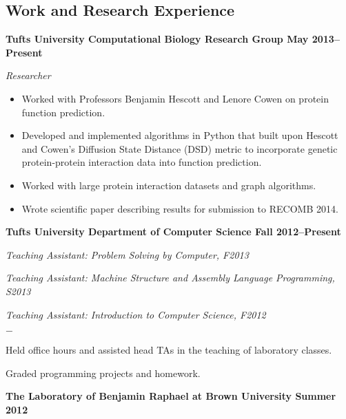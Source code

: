\documentclass[margin,line]{res}
\newenvironment{list1}{
  \begin{list}{\ding{113}}{%
      \setlength{\itemsep}{0in}
      \setlength{\parsep}{0in} \setlength{\parskip}{0in}
      \setlength{\topsep}{0in} \setlength{\partopsep}{0in} 
      \setlength{\leftmargin}{0.17in}}}{\end{list}}
\newenvironment{list2}{
  \begin{list}{$-$}{%
      \setlength{\itemsep}{0in}
      \setlength{\parsep}{0in} \setlength{\parskip}{0in}
      \setlength{\topsep}{0in} \setlength{\partopsep}{0in} 
      \setlength{\leftmargin}{0.2in}}}{\end{list}}
\begin{document}
\begin{resume}
\section{\sc Work and Research Experience}
{\bf Tufts University Computational Biology Research Group \hfill May 2013--Present}\\
\vspace*{-.15in}
\begin{list1}
\item [] {\em Researcher}
\item [] { \begin{itemize}[topsep=0pt,itemsep=-1pt]
            \item Worked with Professors Benjamin Hescott and Lenore Cowen on protein function prediction.
            \item Developed and implemented algorithms in Python that built upon Hescott and Cowen's Diffusion State Distance (DSD) metric to incorporate genetic protein-protein interaction data into function prediction.
            \item Worked with large protein interaction datasets and graph algorithms.
            \item Wrote scientific paper describing results for submission to RECOMB 2014.
        \end{itemize}}
\end{list1}
{\bf Tufts University Department of Computer Science \hfill Fall 2012--Present}\\
\vspace*{-.15in}
\begin{list1}
\item [] {\em Teaching Assistant: Problem Solving by Computer, F2013}
\item [] {\em Teaching Assistant: Machine Structure and Assembly Language Programming, S2013}
\item [] {\em Teaching Assistant: Introduction to Computer Science, F2012}
\item [] {\begin{list2}
\item Held office hours and assisted head TAs in the teaching of laboratory classes. 
\item Graded programming projects and homework.
\end{list2}}
\end{list1}
{\bf The Laboratory of Benjamin Raphael at Brown University \hfill Summer 2012}\\

\end{resume}
\end{document}
